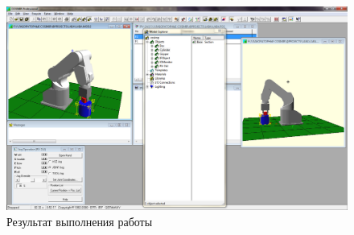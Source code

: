 \begin{figure}[ht]
\centering
	\includegraphics[scale=0.4]{4.png}
	\caption{Результат выполнения работы}
\end{figure}

\clearpage